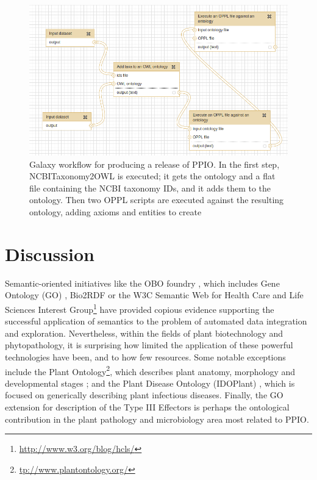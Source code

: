 \documentclass[sw]{iosart2c}
\newcommand{\myurl}[1]{\footnote{\url{#1}}}
\begin{document}
\begin{figure}
\includegraphics{galaxy-workflow.png}
\caption{Galaxy workflow for producing a release of PPIO. In the first step, NCBITaxonomy2OWL is executed; it gets the ontology and a flat file containing the NCBI taxonomy IDs, and it adds them to the ontology. Then two OPPL scripts are executed against the resulting ontology, adding axioms and entities to create }\label{fig:galaxy-workflow}
\end{figure}


\section{Discussion}\label{sec:discussion}

Semantic-oriented initiatives like the OBO foundry \cite{Smith}, which includes Gene Ontology (GO) \cite{Gene}, Bio2RDF \cite{RDF} or the W3C Semantic Web for Health Care and Life Sciences Interest Group\myurl{http://www.w3.org/blog/hcls/} have provided copious evidence supporting the successful application of semantics to the problem of automated data integration and exploration. Nevertheless, within the fields of plant biotechnology and phytopathology, it is surprising how limited the application of these powerful technologies have been, and to how few resources.  Some notable exceptions include the Plant Ontology\myurl{tp://www.plantontology.org/}, which describes plant anatomy, morphology and developmental stages \cite{PO}; and the Plant Disease Ontology (IDOPlant) \cite{Walls} \cite{IDO}, which is focused on generically describing plant infectious diseases. Finally, the GO extension for description of the Type III Effectors \cite{Lindeberg} is perhaps the ontological contribution in the plant pathology and microbiology area most related to PPIO.
\end{document}
